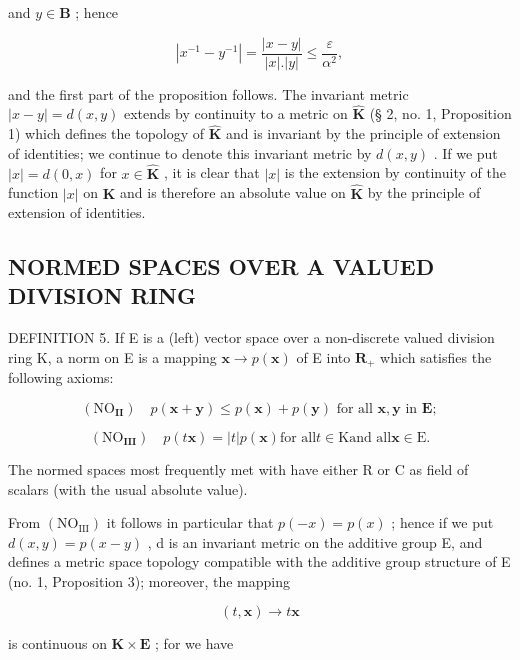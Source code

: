 and \(y\in \mathbf{B}\) ; hence

\[
\left| x ^ {- 1} - y ^ {- 1} \right| = \frac {\left| x - y \right|}{\left| x \right| . \left| y \right|} \leqslant \frac {\varepsilon}{\alpha^ {2}},
\]

and the first part of the proposition follows. The invariant metric \(|x - y| = d(x, y)\) extends by continuity to a metric on \(\hat{\mathbf{K}}\) (§ 2, no. 1, Proposition 1) which defines the topology of \(\hat{\mathbf{K}}\) and is invariant by the principle of extension of identities; we continue to denote this invariant metric by \(d(x, y)\) . If we put \(|x| = d(0, x)\) for \(x \in \hat{\mathbf{K}}\) , it is clear that \(|x|\) is the extension by continuity of the function \(|x|\) on \(\mathbf{K}\) and is therefore an absolute value on \(\hat{\mathbf{K}}\) by the principle of extension of identities.

\subsection{NORMED SPACES OVER A VALUED DIVISION RING}

DEFINITION 5. If E is a (left) vector space over a non-discrete valued division ring K, a norm on E is a mapping \(\mathbf{x} \to p(\mathbf{x})\) of E into \(\mathbf{R}_+\) which satisfies the following axioms:

\[
\left(\mathrm{NO} _ {\mathbf {I I}}\right) \quad p (\boldsymbol {x} + \boldsymbol {y}) \leqslant p (\boldsymbol {x}) + p (\boldsymbol {y}) \text {   for   all   } \boldsymbol {x}, \boldsymbol {y} \text {   in   } \mathbf {E};
\]

\[
\left(\mathrm{NO} _ {\mathbf {I I I}}\right) \quad p (t \boldsymbol {x}) = | t | p (\boldsymbol {x}) \text {for all} t \in \mathrm{K} \text {and all} \boldsymbol {x} \in \mathrm{E}.
\]

The normed spaces most frequently met with have either R or C as field of scalars (with the usual absolute value).

From \((\mathrm{NO}_{\mathrm{III}})\) it follows in particular that \(p(-x)=p(x)\) ; hence if we put \(d(x,y)=p(x-y)\) , d is an invariant metric on the additive group E, and defines a metric space topology compatible with the additive group structure of E (no. 1, Proposition 3); moreover, the mapping

\[
(t, \boldsymbol {x}) \rightarrow t \boldsymbol {x}
\]

is continuous on \(\mathbf{K} \times \mathbf{E}\) ; for we have

